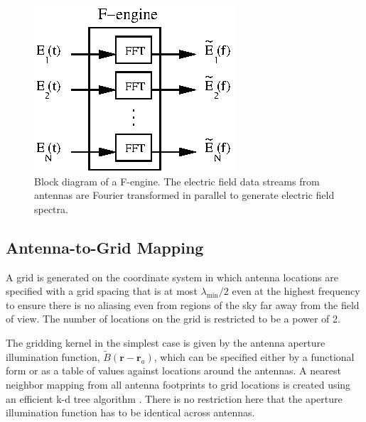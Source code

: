 \documentclass[a4paper,fleqn,usenatbib]{../mnras}
\begin{document}
\begin{figure}
  \includegraphics[width=\columnwidth]{F-engine.eps}
  \caption{Block diagram of a F-engine. The electric field data streams from
    antennas are Fourier transformed in parallel to generate electric field
    spectra.}
  \label{fig:f-engine}
\end{figure}

\subsection{Antenna-to-Grid Mapping}

A grid is generated on the coordinate system in which antenna locations are
specified with a grid spacing that is at most $\lambda_\textrm{min}/2$ even at the
highest frequency to ensure there is no aliasing even from regions of the sky far
away from the field of view. The number of locations on the grid is restricted to
be a power of 2. 

The gridding kernel in the simplest case is given by the antenna aperture
illumination function, $\widetilde{B}(\mathbf{r}-\mathbf{r}_a)$, which can
be specified either by a functional form or as a table of values against locations
around the antennas. A nearest neighbor mapping from all antenna footprints to
grid locations is created using an efficient k-d tree algorithm \citep{man99}.
There is no restriction here that the aperture illumination function has to be
identical across antennas. 
\end{document}
